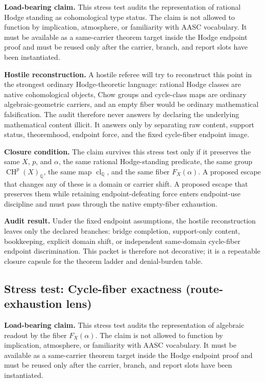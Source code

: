 \documentclass[11pt]{article}
\newcommand{\QQ}{\mathbb{Q}}
\newcommand{\CH}{\operatorname{CH}}
\newcommand{\clQ}{\operatorname{cl}_{\QQ}}
\begin{document}
\par\noindent\textbf{Load-bearing claim.} This stress test audits the representation of rational Hodge standing as cohomological type status. The claim is not allowed to function by implication, atmosphere, or familiarity with AASC vocabulary. It must be available as a same-carrier theorem target inside the Hodge endpoint proof and must be reused only after the carrier, branch, and report slots have been instantiated.

\par\noindent\textbf{Hostile reconstruction.} A hostile referee will try to reconstruct this point in the strongest ordinary Hodge-theoretic language: rational Hodge classes are native cohomological objects, Chow groups and cycle-class maps are ordinary algebraic-geometric carriers, and an empty fiber would be ordinary mathematical falsification. The audit therefore never answers by declaring the underlying mathematical content illicit. It answers only by separating raw content, support status, theoremhood, endpoint force, and the fixed cycle-fiber endpoint image.

\par\noindent\textbf{Closure condition.} The claim survives this stress test only if it preserves the same $X$, $p$, and $\alpha$, the same rational Hodge-standing predicate, the same group $\CH^p(X)_\QQ$, the same map $\clQ$, and the same fiber $F_X(\alpha)$. A proposed escape that changes any of these is a domain or carrier shift. A proposed escape that preserves them while retaining endpoint-defeating force enters endpoint-use discipline and must pass through the native empty-fiber exhaustion.

\par\noindent\textbf{Audit result.} Under the fixed endpoint assumptions, the hostile reconstruction leaves only the declared branches: bridge completion, support-only content, bookkeeping, explicit domain shift, or independent same-domain cycle-fiber endpoint discrimination. This packet is therefore not decorative; it is a repeatable closure capsule for the theorem ladder and denial-burden table.


\subsection{Stress test: Cycle-fiber exactness (route-exhaustion lens)}

\par\noindent\textbf{Load-bearing claim.} This stress test audits the representation of algebraic readout by the fiber $F_X(\alpha)$. The claim is not allowed to function by implication, atmosphere, or familiarity with AASC vocabulary. It must be available as a same-carrier theorem target inside the Hodge endpoint proof and must be reused only after the carrier, branch, and report slots have been instantiated.
\end{document}
